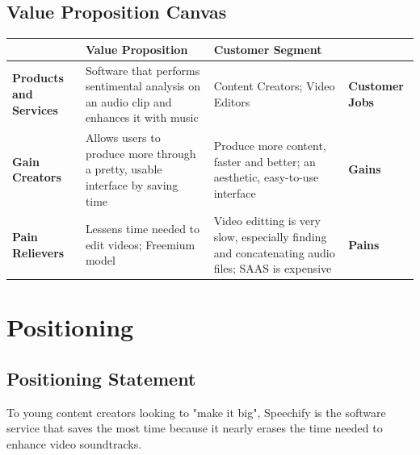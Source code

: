 \documentclass[letterpaper]{article}
\begin{document}
    \subsection{Value Proposition Canvas}
        \begin{tabular} { | p{2cm} | p{3.25cm} | p{3.25cm}| p{1.75cm} |}
            \hline
             & \textbf{Value Proposition} & \textbf{Customer Segment} & \\
            \hline
            \textbf{Products and Services} 
            & Software that performs sentimental analysis on an audio clip and enhances it with music
            & Content Creators; Video Editors
            & \textbf{Customer Jobs}\\
            \hline
            \textbf{Gain Creators} 
            & Allows users to produce more through a pretty, usable interface by saving time 
            & Produce more content, faster and better; an aesthetic, easy-to-use interface
            & \textbf{Gains} \\
            \hline
            \textbf{Pain Relievers} 
            & Lessens time needed to edit videos; Freemium model
            & Video editting is very slow, especially finding and concatenating audio files; SAAS is expensive
            & \textbf{Pains} \\
            \hline
        \end{tabular}
\section{Positioning}
    \subsection{Positioning Statement}
    To young content creators looking to "make it big", Speechify is the software service that saves the most time because it nearly erases the time needed to enhance video soundtracks.
\end{document}
